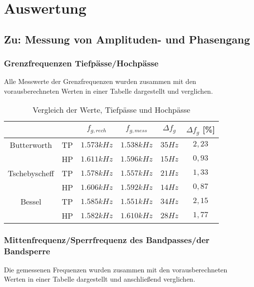 \section{Auswertung}
\subsection{Zu: Messung von Amplituden- und Phasengang}
\subsubsection{Grenzfrequenzen Tiefpässe/Hochpässe}
\noindent Alle Messwerte der Grenzfrequenzen wurden zusammen mit den vorausberechneten Werten in einer Tabelle dargestellt und verglichen.
   	  
   	  \begin{table}[h]
   	  	\centering
   	  	\begin{tabular}{c|c|c|c|c|c|}
						   	&	& $f_{g,rech}$	& $f_{g,mess}$	& $\Delta f_g$	& $\Delta f_g$ [\%] \\
   	  		\hline
   	  		Butterworth		& TP& $1.573kHz$	& $1.538kHz$	& $35Hz$		& $2,23$\\
							& HP& $1.611kHz$	& $1.596kHz$	& $15Hz$		& $0,93$\\
			\hline
   	  		Tschebyscheff	& TP& $1.578kHz$	& $1.557kHz$	& $21Hz$		& $1,33$\\
				   	  		& HP& $1.606kHz$	& $1.592kHz$	& $14Hz$		& $0,87$\\
   	  		\hline
   	  		Bessel			& TP& $1.585kHz$	& $1.551kHz$	& $34Hz$		& $2,15$\\
				   	  		& HP& $1.582kHz$	& $1.610kHz$	& $28Hz$		& $1,77$
   	  	\end{tabular}
		\caption{Vergleich der Werte, Tiefpässe und Hochpässe}
		\label{tab:grenzfrequnzen_hp_tp_vorausberechnung}
   	  \end{table}
   	  
   	  \newpage

\subsubsection{Mittenfrequenz/Sperrfrequenz des Bandpasses/der Bandsperre}
\noindent Die gemessenen Frequenzen wurden zusammen mit den vorausberechneten Werten in einer Tabelle dargestellt und anschließend verglichen.

		\begin{table}[h]
			\centering
			\caption{Vergleich der Werte, Bandpass und Bandsperre}
			\label{tab:grenzfrequnzen_bs_bp_vorausberechnung}
		\end{table}
		
